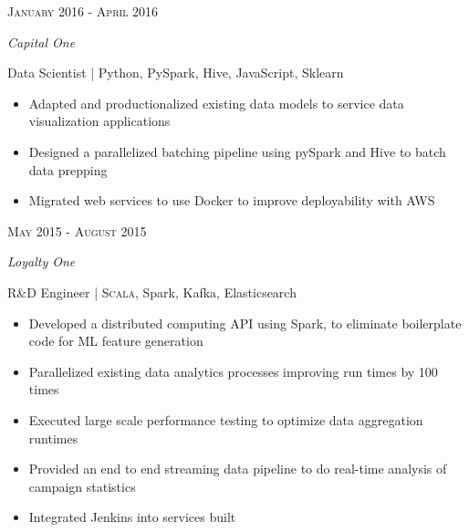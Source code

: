 \documentclass[11pt]{article} %
\begin{document}
{\begin{minipage}[t]{0.52\textwidth}
\begin{itemize}[noitemsep, nosep, leftmargin=.75cm]
\end{itemize}


{\raggedleft\color{gray}\textsc{January 2016 - April 2016}\par}

{\textit{{Capital One}}\\
\raggedright\large Data Scientist \small\color{darkgray} | Python, PySpark, Hive, JavaScript, Sklearn\\[5pt]}

\begin{itemize}[noitemsep, nosep, leftmargin=.75cm]
  \setlength\itemsep{.25em}
  \item {Adapted and productionalized existing data models to service data visualization applications}
  \item {Designed a parallelized batching pipeline using pySpark and Hive to batch data prepping}
  \item {Migrated web services to use Docker to improve deployability with AWS}
\end{itemize}


{\raggedleft\color{gray}\textsc{May 2015 - August 2015}\par}

{\textit{{Loyalty One}}\\
\raggedright\large R\&D Engineer \small\color{darkgray} | \textsc{Scala}, Spark, Kafka, Elasticsearch\\[5pt]}

\begin{itemize}[noitemsep, nosep, leftmargin=.75cm]
  \setlength\itemsep{.25em}
  \item {Developed a distributed computing API using Spark, to eliminate boilerplate code for ML feature generation}
  \item {Parallelized existing data analytics processes improving run times by 100 times}
  \item {Executed large scale performance testing to optimize data aggregation runtimes}
  \item {Provided an end to end streaming data pipeline to do real-time analysis of campaign statistics}
  \item {Integrated Jenkins into services built}
\end{itemize}



\end{minipage}}
\end{document}
